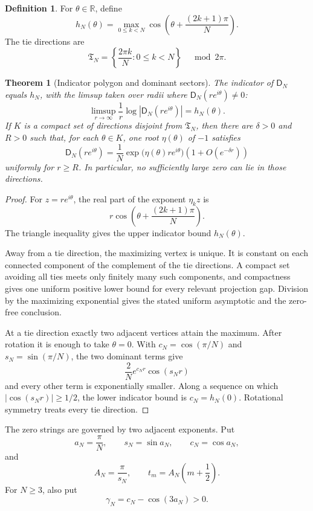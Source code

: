 \documentclass[11pt,letterpaper]{article}
\newtheorem{theorem}{Theorem}[section]
\theoremstyle{definition}
\newtheorem{definition}[definition]{Definition}
\theoremstyle{remark}
\newcommand{\Dfun}{\mathsf D}
\begin{document}
\begin{definition}\label{def:indicator_polygon}
For $\theta\in\mathbb R$, define
\[
h_N(\theta)
=
\max_{0\leq k<N}
\cos\left(\theta+\frac{(2k+1)\pi}{N}\right).
\]
The tie directions are
\[
\mathfrak T_N
=
\left\{\frac{2\pi k}{N}:0\leq k<N\right\}
\quad\bmod 2\pi.
\]
\end{definition}

\begin{theorem}[Indicator polygon and dominant sectors]\label{thm:indicator_polygon}
The indicator of $\Dfun_N$ equals $h_N$, with the limsup taken over radii where $\Dfun_N(re^{i\theta})\ne0$:
\[
\limsup_{r\to\infty}
\frac1r\log|\Dfun_N(re^{i\theta})|
=
h_N(\theta).
\]
If $K$ is a compact set of directions disjoint from $\mathfrak T_N$, then there are $\delta>0$ and $R>0$ such that, for each $\theta\in K$, one root $\eta(\theta)$ of $-1$ satisfies
\[
\Dfun_N(re^{i\theta})
=
\frac1N
\exp\bigl(\eta(\theta)re^{i\theta}\bigr)
\left(1+O(e^{-\delta r})\right)
\]
uniformly for $r\geq R$.  In particular, no sufficiently large zero can lie in those directions.
\end{theorem}

\begin{proof}
For $z=re^{i\theta}$, the real part of the exponent $\eta_kz$ is
\[
r\cos\left(\theta+\frac{(2k+1)\pi}{N}\right).
\]
The triangle inequality gives the upper indicator bound $h_N(\theta)$.

Away from a tie direction, the maximizing vertex is unique.  It is constant
on each connected component of the complement of the tie directions.  A
compact set avoiding all ties meets only finitely many such components, and
compactness gives one uniform positive lower bound for every relevant
projection gap.  Division by the maximizing exponential gives the stated
uniform asymptotic and the zero-free conclusion.

At a tie direction exactly two adjacent vertices attain the maximum.  After rotation it is enough to take $\theta=0$.  With $c_N=\cos(\pi/N)$ and $s_N=\sin(\pi/N)$, the two dominant terms give
\[
\frac2N e^{c_Nr}\cos(s_Nr)
\]
and every other term is exponentially smaller.  Along a sequence on which $|\cos(s_Nr)|\geq1/2$, the lower indicator bound is $c_N=h_N(0)$.  Rotational symmetry treats every tie direction.
\end{proof}

The zero strings are governed by two adjacent exponents.  Put
\[
a_N=\frac\pi N,
\qquad
s_N=\sin a_N,
\qquad
c_N=\cos a_N,
\]
and
\[
A_N=\frac\pi{s_N},
\qquad
 t_m=A_N\left(m+\frac12\right).
\]
For $N\geq3$, also put
\[
\gamma_N=c_N-\cos(3a_N)>0.
\]
\end{document}
